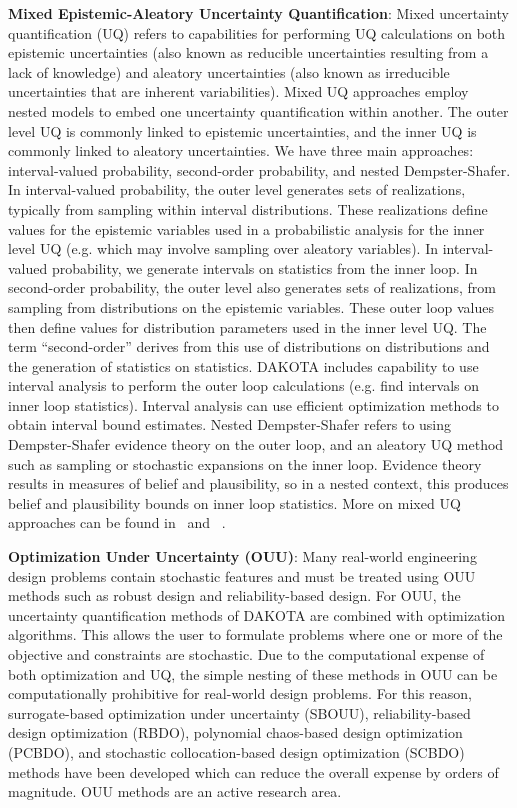 \textbf{Mixed Epistemic-Aleatory Uncertainty Quantification}: Mixed
uncertainty quantification (UQ) refers to capabilities for performing
UQ calculations on both epistemic uncertainties (also known as
reducible uncertainties resulting from a lack of knowledge) and
aleatory uncertainties (also known as irreducible uncertainties that
are inherent variabilities).  Mixed UQ approaches employ nested models
to embed one uncertainty quantification within another.  The outer
level UQ is commonly linked to epistemic uncertainties, and the inner
UQ is commonly linked to aleatory uncertainties.  We have three main
approaches: interval-valued probability, second-order probability, and
nested Dempster-Shafer.  In interval-valued probability, the outer
level generates sets of realizations, typically from sampling within
interval distributions.  These realizations define values for the
epistemic variables used in a probabilistic analysis for the inner
level UQ (e.g. which may involve sampling over aleatory variables).
In interval-valued probability, we generate intervals on statistics
from the inner loop.  In second-order probability, the outer level
also generates sets of realizations, from sampling from distributions
on the epistemic variables.  These outer loop values then define
values for distribution parameters used in the inner level UQ.  The
term ``second-order'' derives from this use of distributions on
distributions and the generation of statistics on statistics.  DAKOTA
includes capability to use interval analysis to perform the outer loop
calculations (e.g. find intervals on inner loop statistics).  Interval
analysis can use efficient optimization methods to obtain interval
bound estimates.  Nested Dempster-Shafer refers to using
Dempster-Shafer evidence theory on the outer loop, and an aleatory UQ
method such as sampling or stochastic expansions on the inner loop.
Evidence theory results in measures of belief and plausibility, so in a
nested context, this produces belief and plausibility bounds on inner
loop statistics.  More on mixed UQ approaches can be found
in~\cite{Eld09b} and ~\cite{Eld11}.

\textbf{Optimization Under Uncertainty (OUU)}: Many real-world
engineering design problems contain stochastic features and must be
treated using OUU methods such as robust design and reliability-based
design. For OUU, the uncertainty quantification methods of DAKOTA are
combined with optimization algorithms. This allows the user to
formulate problems where one or more of the objective and constraints
are stochastic. Due to the computational expense of both optimization
and UQ, the simple nesting of these methods in OUU can be
computationally prohibitive for real-world design problems. For this
reason, surrogate-based optimization under uncertainty (SBOUU),
reliability-based design optimization (RBDO), polynomial chaos-based
design optimization (PCBDO), and stochastic collocation-based design
optimization (SCBDO) methods have been developed which can reduce the
overall expense by orders of magnitude. OUU methods are an active
research area.

